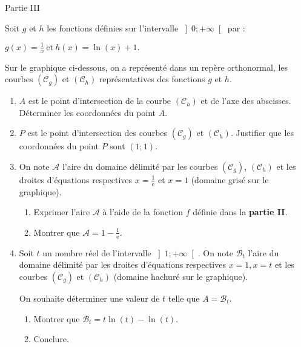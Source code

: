 \begin{h3} Partie III \end{h3}
Soit $g$ et $h$ les fonctions définies sur l'intervalle $\left]0; +\infty \right[$ par :
\par
$g\left(x\right)=\frac{1}{x}\   \text{et} \   h\left(x\right)=\ln \left(x\right)+1.$
\par
Sur le graphique ci-dessous, on a représenté dans un repère orthonormal, les courbes $\left(\mathscr C_{g}\right)$ et $\left(\mathscr C_{h}\right)$ représentatives des fonctions $g$ et $h$.

\begin{center}
\end{center}
\begin{enumerate}
     \item
     $A$ est le point d'intersection de la courbe $\left(\mathscr C_{h}\right)$ et de l'axe des abscisses. Déterminer les coordonnées du point $A$.
     \item
     $P$ est le point d'intersection des courbes $\left(\mathscr C_{g}\right)$ et $\left(\mathscr C_{h}\right)$. Justifier que les coordonnées du point $P$ sont $\left(1 ; 1\right)$.
     \item
     On note $\mathscr A$ l'aire du domaine délimité par les courbes $\left(\mathscr C_{g}\right)$, $\left(\mathscr C_{h}\right)$ et les droites d'équations respectives $x=\frac{1}{\text{e}}$ et $x=1$ (domaine grisé sur le graphique).
     \begin{enumerate}
          \item
          Exprimer l'aire $\mathscr A$ à l'aide de la fonction $f$ définie dans la \textbf{partie II}.
          \item
          Montrer que $\mathscr A=1-\frac{1}{\text{e}}$.
     \end{enumerate}
     \item
     Soit $t$ un nombre réel de l'intervalle $\left]1; +\infty \right[$. On note $\mathscr B_{t}$ l'aire du domaine délimité par les droites d'équations respectives $x=1, x=t$ et les courbes $\left(\mathscr C_{g}\right)$ et $\left(\mathscr C_{h}\right)$ (domaine hachuré sur le graphique).
     \par
     On souhaite déterminer une valeur de $t$ telle que $A=\mathscr B_{t}$.
     \begin{enumerate}[label=\alph*.]
          \item
          Montrer que $\mathscr B_{t}=t \ln \left(t\right)-\ln \left(t\right)$.
          \item
          Conclure.
     \end{enumerate}
\end{enumerate}
